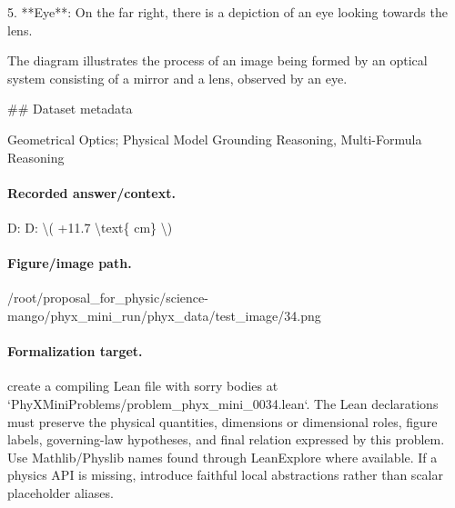 5. **Eye**: On the far right, there is a depiction of an eye looking towards the lens.

The diagram illustrates the process of an image being formed by an optical system consisting of a mirror and a lens, observed by an eye.

\#\# Dataset metadata

Geometrical Optics; Physical Model Grounding Reasoning, Multi-Formula Reasoning

\paragraph{Recorded answer/context.}
D: D: \textbackslash{}( +11.7 \textbackslash{}text\{ cm\} \textbackslash{})

\paragraph{Figure/image path.}
/root/proposal\_for\_physic/science-mango/phyx\_mini\_run/phyx\_data/test\_image/34.png

\paragraph{Formalization target.}
create a compiling Lean file with sorry bodies at `PhyXMiniProblems/problem\_phyx\_mini\_0034.lean`. The Lean declarations must preserve the physical quantities, dimensions or dimensional roles, figure labels, governing-law hypotheses, and final relation expressed by this problem.
Use Mathlib/Physlib names found through LeanExplore where available. If a physics API is missing, introduce faithful local abstractions rather than scalar placeholder aliases.

